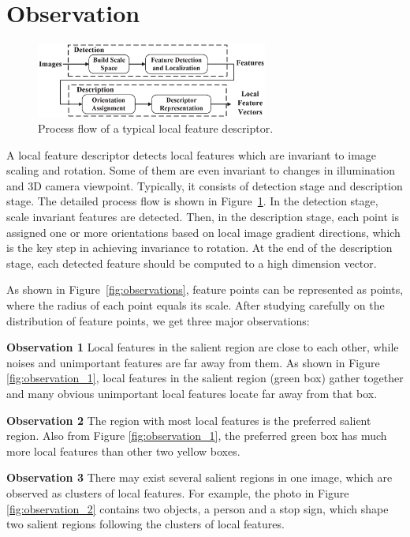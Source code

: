 \section{Observation}
\label{sec:observation}

\begin{figure}
	\centering
	\includegraphics[width=3.0in]{images/fig-workflow.eps}
	\caption{Process flow of a typical local feature descriptor.}
	\label{fig:workflow}
\end{figure}

A local feature descriptor detects local features which are invariant to image scaling and rotation. Some of them are even invariant to changes in illumination and 3D camera viewpoint. Typically, it consists of detection stage and description stage. The detailed process flow is shown in Figure~\ref{fig:workflow}. In the detection stage, scale invariant features are detected. Then, in the description stage, each point is assigned one or more orientations based on local image gradient directions, which is the key step in achieving invariance to rotation. At the end of the description stage, each detected feature should be computed to a high dimension vector. 

As shown in Figure~\ref{fig:observations}, feature points can be represented as points, where the radius of each point equals its scale. After studying carefully on the distribution of feature points, we get three major observations:

\begin{description}
	
	\item \textbf{Observation 1}  Local features in the salient region are close to each other, while noises and unimportant features are far away from them. As shown in Figure \ref{fig:observation_1}, local features in the salient region (green box) gather together and many obvious unimportant local features locate far away from that box. 

	\item \textbf{Observation 2}  The region with most local features is the preferred salient region. Also from Figure \ref{fig:observation_1}, the preferred green box has much more local features than other two yellow boxes. 

	\item \textbf{Observation 3}  There may exist several salient regions in one image, which are observed as clusters of local features. For example, the photo in Figure \ref{fig:observation_2} contains two objects, a person and a stop sign, which shape two salient regions following the clusters of local features.

\end{description}

